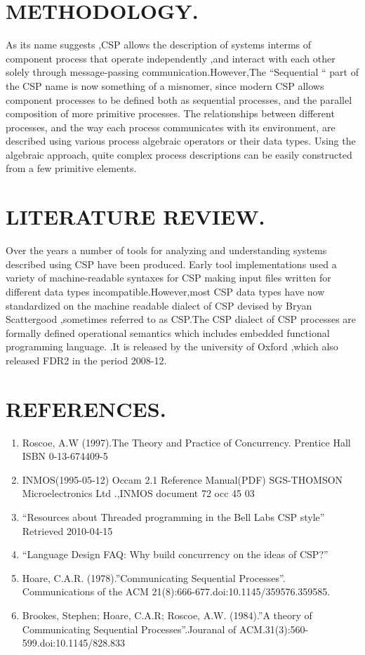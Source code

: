 \documentclass{article}
\begin{document}
\section{METHODOLOGY.}
As  its name suggests ,CSP allows the description of systems interms of component process that operate independently ,and interact with each other solely through message-passing communication.However,The “Sequential “ part of the CSP name is now something of a misnomer, since modern  CSP allows component processes to be defined both as sequential processes, and the parallel composition of more primitive processes. The relationships between different processes, and the way each process communicates with its environment, are described using various process algebraic operators or their data types. Using the algebraic approach, quite complex process descriptions can be easily constructed from a few primitive elements.
\section{LITERATURE REVIEW.}
Over the years a number of tools for analyzing and understanding systems described using CSP have been produced. Early tool implementations used a variety of machine-readable syntaxes for CSP making input files written for different data types incompatible.However,most CSP data types have now standardized on the machine readable dialect of CSP devised by Bryan Scattergood ,sometimes referred to as CSP.The CSP dialect of CSP processes are formally defined operational semantics  which includes embedded functional programming language.
 .It is released by the university of Oxford ,which also released FDR2 in the period 2008-12.
\section{REFERENCES.}
\begin{enumerate}
\item	Roscoe, A.W (1997).The Theory and Practice of Concurrency. Prentice Hall ISBN 0-13-674409-5
\item	INMOS(1995-05-12) Occam 2.1 Reference Manual(PDF) SGS-THOMSON Microelectronics Ltd .,INMOS document  72 occ 45 03
\item	“Resources about Threaded programming in the Bell Labs CSP style” Retrieved 2010-04-15
\item	“Language Design FAQ: Why build concurrency on the ideas of CSP?”
\item	Hoare, C.A.R. (1978).”Communicating Sequential Processes”. Communications of the ACM 21(8):666-677.doi:10.1145/359576.359585.
\item	Brookes, Stephen; Hoare, C.A.R; Roscoe, A.W. (1984).”A theory of Communicating Sequential Processes”.Jouranal of ACM.31(3):560-599.doi:10.1145/828.833
\end{enumerate}
\end{document}
